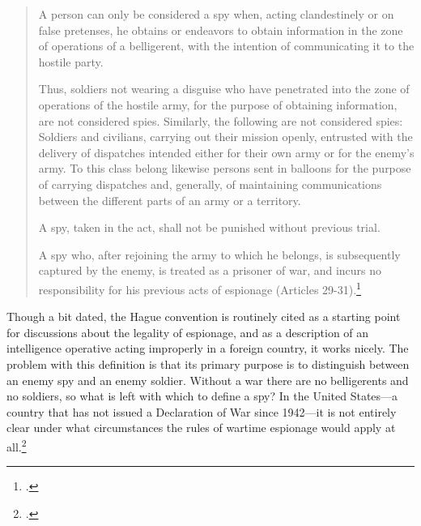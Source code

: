 \documentclass{memoir}
\begin{document}
\begin{refsegment}
\begin{quote}
A person can only be considered a spy when, acting clandestinely or on false pretenses, he obtains or endeavors to obtain information in the zone of operations of a belligerent, with the intention of communicating it to the hostile party.

Thus, soldiers not wearing a disguise who have penetrated into the zone of operations of the hostile army, for the purpose of obtaining information, are not considered spies. Similarly, the following are not considered spies: Soldiers and civilians, carrying out their mission openly, entrusted with the delivery of dispatches intended either for their own army or for the enemy's army. To this class belong likewise persons sent in balloons for the purpose of carrying dispatches and, generally, of maintaining communications between the different parts of an army or a territory.

A spy, taken in the act, shall not be punished without previous trial.

A spy who, after rejoining the army to which he belongs, is subsequently captured by the enemy, is treated as a prisoner of war, and incurs no responsibility for his previous acts of espionage (Articles 29-31).\footcite{noauthor_hague_1907}
\end{quote}

Though a bit dated, the Hague convention is routinely cited as a starting point for discussions about the legality of espionage, and as a description of an intelligence operative acting improperly in a foreign country, it works nicely. The problem with this definition is that its primary purpose is to distinguish between an enemy spy and an enemy soldier. Without a war there are no belligerents and no soldiers, so what is left with which to define a spy? In the United States---a country that has not issued a Declaration of War since 1942---it is not entirely clear under what circumstances the rules of wartime espionage would apply at all.\footcite{ncc_staff_when_2018}



\end{refsegment}
\end{document}
